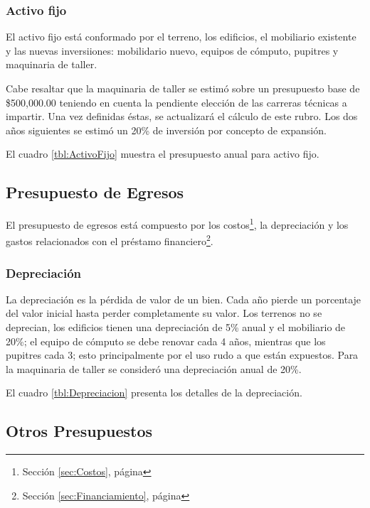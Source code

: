 \subsubsection{Activo fijo}

El activo fijo está conformado por el terreno, los edificios, el mobiliario existente y las nuevas inversiiones: mobilidario nuevo, equipos de cómputo, pupitres y maquinaria de taller.

Cabe resaltar que la maquinaria de taller se estimó sobre un presupuesto base de \$500,000.00 teniendo en cuenta la pendiente elección de las carreras técnicas a impartir. Una vez definidas éstas, se actualizará el cálculo de este rubro. Los dos años siguientes se estimó un 20\% de inversión por concepto de expansión.

El cuadro \ref{tbl:ActivoFijo} muestra el presupuesto anual para activo fijo.



\subsection{Presupuesto de Egresos}

El presupuesto de egresos está compuesto por los costos\footnote{Sección \ref{sec:Costos}, página \pageref{sec:Costos}}, la depreciación y los gastos relacionados con el préstamo financiero\footnote{Sección \ref{sec:Financiamiento}, página \pageref{sec:Financiamiento}}.

\subsubsection{Depreciación}

La depreciación es la pérdida de valor de un bien. Cada año pierde un porcentaje del valor inicial hasta perder completamente su valor. Los terrenos no se deprecian, los edificios tienen una depreciación de 5\% anual y el mobiliario de 20\%; el equipo de cómputo se debe renovar cada 4 años, mientras que los pupitres cada 3; esto principalmente por el uso rudo a que están expuestos. Para la maquinaria de taller se consideró una depreciación anual de 20\%.

El cuadro \ref{tbl:Depreciacion} presenta los detalles de la depreciación.



\subsection{Otros Presupuestos}
\label{sub:Otros:Presupuestos}

